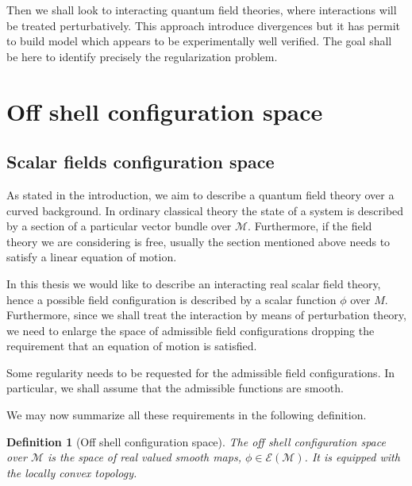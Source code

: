 \documentclass[12pt]{book}
\newcommand{\Dcal}{\mathcal{D}}
\newcommand{\Ecal}{\mathcal{E}}
\newcommand{\Mcal}{\mathcal{M}}
\theoremstyle{break}
\newtheorem{definition}{Definition}
\begin{document}


Then we shall look to interacting quantum field theories, where interactions will be treated perturbatively. This approach introduce divergences but it has permit to build model which appears to be experimentally well verified. The goal shall be here to identify precisely the regularization problem.


\section{Off shell configuration space}


\subsection{Scalar fields configuration space}


As stated in the introduction, we aim to describe a quantum field theory over a curved background. In ordinary classical theory the state of a system is described by a section of a particular vector bundle over $\Mcal$. Furthermore, if the field theory we are considering is free, usually the section mentioned above needs to satisfy a linear equation of motion.




In this thesis we would like to describe an interacting real scalar field theory, hence a possible field configuration is described by a scalar function $\phi$ over $M$. Furthermore, since we shall treat the interaction by means of perturbation theory, we need to enlarge the space of admissible field configurations dropping the requirement that an equation of motion is satisfied.




Some regularity needs to be requested for the admissible field configurations. In particular, we shall assume that the admissible functions are smooth.   




We may now summarize all these requirements in the following definition.


\begin{definition}[Off shell configuration space]
The off shell configuration space over $\Mcal$ is the space of real valued smooth maps, $\phi \in \Ecal(\Mcal)$. It is equipped with the locally convex topology.
\end{definition}
\end{document}
